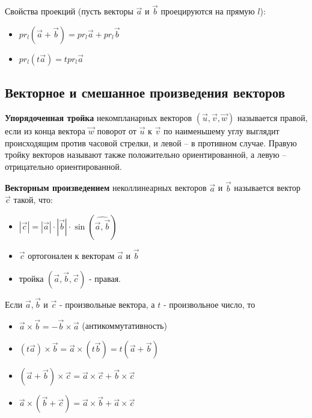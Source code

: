 \documentclass[a4paper]{article}
\begin{document}
    Свойства проекций (пусть векторы $\vec{a}$ и $\vec{b}$ проецируются на прямую $l$):
    \begin{itemize}
        \item $pr_l (\vec{a} + \vec{b}) = pr_l \vec{a} + pr_l \vec{b}$
        \item $pr_l (t \vec{a}) = t pr_l \vec{a}$
    \end{itemize}


    \newpage \begin{center}
                 \begin{Large}
                 \end{Large}
    \end{center}
    \subsection*{Векторное и смешанное произведения векторов}

    \textbf{Упорядоченная тройка} некомпланарных векторов $(\vec{u}, \vec{v}, \vec{w})$  называется
    правой, если из конца вектора $\vec{w}$ поворот от $\vec{u}$ к $\vec{v}$ по наименьшему углу
    выглядит происходящим против часовой стрелки, и левой – в противном случае. Правую тройку векторов называют также положительно
    ориентированной, а левую – отрицательно ориентированной.

    \textbf{Векторным произведением} неколлинеарных векторов $\vec{a}$ и $\vec{b}$ называется
    вектор $\vec{c}$ такой, что:
    \begin{itemize}
        \item $| \vec{c}| = | \vec{a} | \cdot | \vec{b} | \cdot \sin (\widehat{\vec{a}, \vec{b}})$
        \item $\vec{c}$ ортогонален к векторам $\vec{a}$ и $\vec{b}$
        \item тройка $(\vec{a}, \vec{b}, \vec{c})$ - правая.
    \end{itemize}

    Если $\vec{a}, \vec{b}$ и $\vec{c}$ - произвольные вектора, а $t$ - произвольное число, то
    \begin{itemize}
        \item $\vec{a} \times \vec{b} = -\vec{b} \times \vec{a}$ (антикоммутативность)
        \item $(t \vec{a}) \times \vec{b} = \vec{a} \times (t \vec{b}) = t ( \vec{a} + \vec{b})$
        \item $(\vec{a} +\vec{b}) \times \vec{c} = \vec{a} \times \vec{c} + \vec{b} \times \vec{c}$
        \item $\vec{a} \times (\vec{b} + \vec{c}) = \vec{a} \times \vec{b} +\vec{a} \times \vec{c}$
    \end{itemize}
\end{document}
